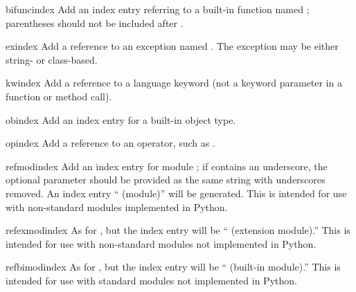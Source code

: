 \documentclass{howto}
\begin{document}
    \begin{macrodesc}{bifuncindex}{}
      Add an index entry referring to a built-in function named
      ; parentheses should not be included after
      .
    \end{macrodesc}

    \begin{macrodesc}{exindex}{}
      Add a reference to an exception named .  The
      exception may be either string- or class-based.
    \end{macrodesc}

    \begin{macrodesc}{kwindex}{}
      Add a reference to a language keyword (not a keyword parameter
      in a function or method call).
    \end{macrodesc}

    \begin{macrodesc}{obindex}{}
      Add an index entry for a built-in object type.
    \end{macrodesc}

    \begin{macrodesc}{opindex}{}
      Add a reference to an operator, such as \samp{+}.
    \end{macrodesc}

    \begin{macrodesc}{refmodindex}{}
      Add an index entry for module ; if 
      contains an underscore, the optional parameter  should
      be provided as the same string with underscores removed.  An
      index entry `` (module)'' will be generated.  This
      is intended for use with non-standard modules implemented in
      Python.
    \end{macrodesc}

    \begin{macrodesc}{refexmodindex}{}
      As for , but the index entry will be
      `` (extension module).''  This is intended for use
      with non-standard modules not implemented in Python.
    \end{macrodesc}

    \begin{macrodesc}{refbimodindex}{}
      As for , but the index entry will be
      `` (built-in module).''  This is intended for use
      with standard modules not implemented in Python.
    \end{macrodesc}
\end{document}
